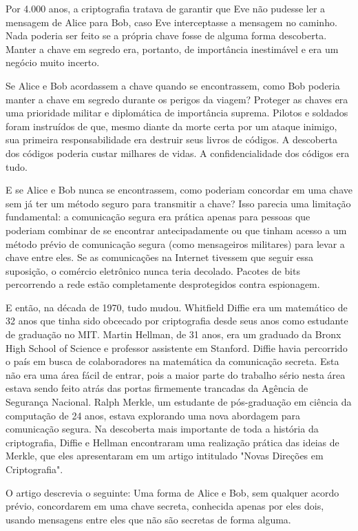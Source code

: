 \documentclass{book}
\begin{document}
Por 4.000 anos, a criptografia tratava de garantir que Eve não pudesse ler a mensagem de Alice para Bob, caso Eve interceptasse a mensagem no caminho. Nada poderia ser feito se a própria chave fosse de alguma forma descoberta. Manter a chave em segredo era, portanto, de importância inestimável e era um negócio muito incerto.

Se Alice e Bob acordassem a chave quando se encontrassem, como Bob poderia manter a chave em segredo durante os perigos da viagem? Proteger as chaves era uma prioridade militar e diplomática de importância suprema. Pilotos e soldados foram instruídos de que, mesmo diante da morte certa por um ataque inimigo, sua primeira responsabilidade era destruir seus livros de códigos. A descoberta dos códigos poderia custar milhares de vidas. A confidencialidade dos códigos era tudo.

E se Alice e Bob nunca se encontrassem, como poderiam concordar em uma chave sem já ter um método seguro para transmitir a chave? Isso parecia uma limitação fundamental: a comunicação segura era prática apenas para pessoas que poderiam combinar de se encontrar antecipadamente ou que tinham acesso a um método prévio de comunicação segura (como mensageiros militares) para levar a chave entre eles. Se as comunicações na Internet tivessem que seguir essa suposição, o comércio eletrônico nunca teria decolado. Pacotes de bits percorrendo a rede estão completamente desprotegidos contra espionagem.

E então, na década de 1970, tudo mudou. Whitfield Diffie era um matemático de 32 anos que tinha sido obcecado por criptografia desde seus anos como estudante de graduação no MIT. Martin Hellman, de 31 anos, era um graduado da Bronx High School of Science e professor assistente em Stanford. Diffie havia percorrido o país em busca de colaboradores na matemática da comunicação secreta. Esta não era uma área fácil de entrar, pois a maior parte do trabalho sério nesta área estava sendo feito atrás das portas firmemente trancadas da Agência de Segurança Nacional. Ralph Merkle, um estudante de pós-graduação em ciência da computação de 24 anos, estava explorando uma nova abordagem para comunicação segura. Na descoberta mais importante de toda a história da criptografia, Diffie e Hellman encontraram uma realização prática das ideias de Merkle, que eles apresentaram em um artigo intitulado "Novas Direções em Criptografia".

O artigo descrevia o seguinte: Uma forma de Alice e Bob, sem qualquer acordo prévio, concordarem em uma chave secreta, conhecida apenas por eles dois, usando mensagens entre eles que não são secretas de forma alguma.
\end{document}
